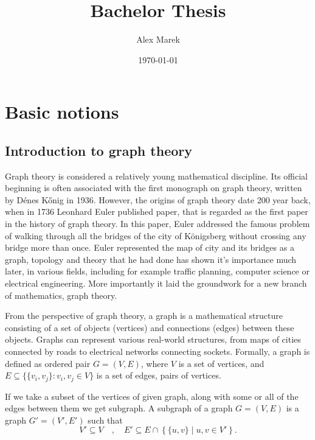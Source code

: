 \documentclass[12pt]{article}
\title{Bachelor Thesis}
\author{Alex Marek}
\date{\today}
\begin{document}
	
	\maketitle
	
	\section{Basic notions}
				
	\subsection{Introduction to graph theory}
		Graph theory is considered a relatively young mathematical discipline. Its official beginning is often associated with the first monograph on graph theory, written by Dénes Kőnig in 1936. However, the origins of graph theory date 200 year back, when in 1736 Leonhard Euler published paper, that is regarded as the first paper in the history of graph theory. In this paper, Euler addressed the famous problem of walking through all the bridges of the city of Königsberg without crossing any bridge more than once. Euler represented the map of city and its bridges as a graph, topology and theory that he had done has shown it's importance much later, in various fields, including for example traffic planning, computer science or electrical engineering. More importantly it laid the groundwork for a new branch of mathematics, graph theory.
		
		From the perspective of graph theory, a graph is a mathematical structure consisting of a set of objects (vertices) and connections (edges) between these objects.
 		Graphs can represent various real-world structures, from maps of cities connected by roads to electrical networks connecting sockets.
		Formally, a graph is defined as ordered pair \( G = (V, E) \), where \( V \) is a set of vertices, and \( E \subseteq \{\{v_i, v_j\} : v_i, v_j \in V\} \) is a set of edges, pairs of vertices.
		
		If we take a subset of the vertices of given graph, along with some or all of the edges between them we get subgraph. A subgraph of a graph \( G = (V, E) \) is a graph \( G' = (V', E') \) such that  
		\[
		V' \subseteq V \quad, \quad E' \subseteq E \cap \left\{ \{u,v\} \mid u,v \in V' \right\}.
		\]
			
\end{document}
